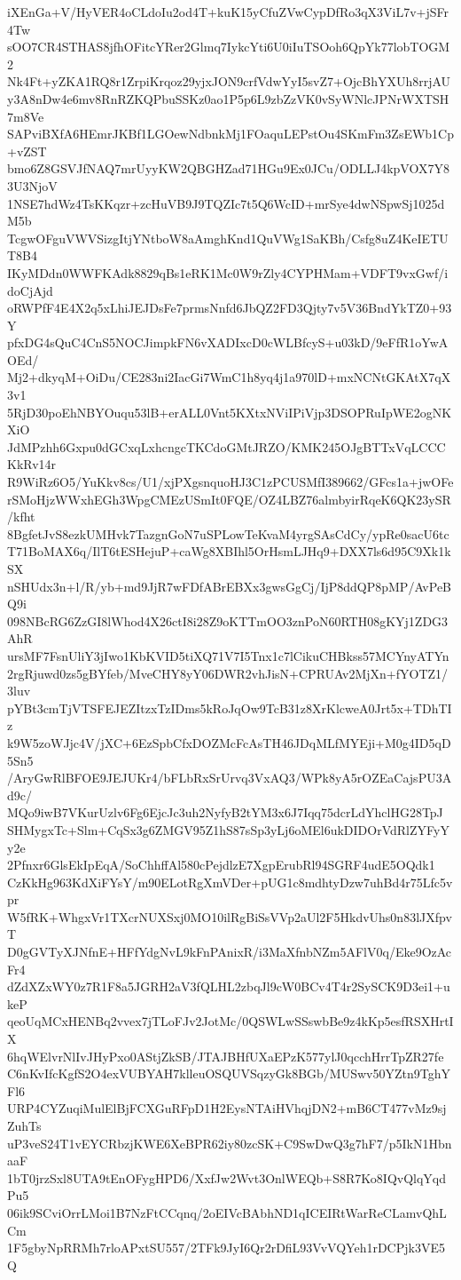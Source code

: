 iXEnGa+V/HyVER4oCLdoIu2od4T+kuK15yCfuZVwCypDfRo3qX3ViL7v+jSFr4Tw
sOO7CR4STHAS8jfhOFitcYRer2Glmq7IykcYti6U0iIuTSOoh6QpYk77lobTOGM2
Nk4Ft+yZKA1RQ8r1ZrpiKrqoz29yjxJON9crfVdwYyI5svZ7+OjcBhYXUh8rrjAU
y3A8nDw4e6mv8RnRZKQPbuSSKz0ao1P5p6L9zbZzVK0vSyWNlcJPNrWXTSH7m8Ve
SAPviBXfA6HEmrJKBf1LGOewNdbnkMj1FOaquLEPstOu4SKmFm3ZsEWb1Cp+vZST
bmo6Z8GSVJfNAQ7mrUyyKW2QBGHZad71HGu9Ex0JCu/ODLLJ4kpVOX7Y83U3NjoV
1NSE7hdWz4TsKKqzr+zcHuVB9J9TQZIc7t5Q6WcID+mrSye4dwNSpwSj1025dM5b
TcgwOFguVWVSizgItjYNtboW8aAmghKnd1QuVWg1SaKBh/Csfg8uZ4KeIETUT8B4
IKyMDdn0WWFKAdk8829qBs1eRK1Mc0W9rZly4CYPHMam+VDFT9vxGwf/idoCjAjd
oRWPfF4E4X2q5xLhiJEJDsFe7prmsNnfd6JbQZ2FD3Qjty7v5V36BndYkTZ0+93Y
pfxDG4sQuC4CnS5NOCJimpkFN6vXADIxcD0cWLBfcyS+u03kD/9eFfR1oYwAOEd/
Mj2+dkyqM+OiDu/CE283ni2IacGi7WmC1h8yq4j1a970lD+mxNCNtGKAtX7qX3v1
5RjD30poEhNBYOuqu53lB+erALL0Vnt5KXtxNViIPiVjp3DSOPRuIpWE2ogNKXiO
JdMPzhh6Gxpu0dGCxqLxhcngcTKCdoGMtJRZO/KMK245OJgBTTxVqLCCCKkRv14r
R9WiRz6O5/YuKkv8cs/U1/xjPXgsnquoHJ3C1zPCUSMfI389662/GFcs1a+jwOFe
rSMoHjzWWxhEGh3WpgCMEzUSmIt0FQE/OZ4LBZ76almbyirRqeK6QK23ySR/kfht
8BgfetJvS8ezkUMHvk7TazgnGoN7uSPLowTeKvaM4yrgSAsCdCy/ypRe0sacU6tc
T71BoMAX6q/IlT6tESHejuP+caWg8XBIhl5OrHsmLJHq9+DXX7ls6d95C9Xk1kSX
nSHUdx3n+l/R/yb+md9JjR7wFDfABrEBXx3gwsGgCj/IjP8ddQP8pMP/AvPeBQ9i
098NBcRG6ZzGI8lWhod4X26ctI8i28Z9oKTTmOO3znPoN60RTH08gKYj1ZDG3AhR
ursMF7FsnUliY3jIwo1KbKVID5tiXQ71V7I5Tnx1c7lCikuCHBkss57MCYnyATYn
2rgRjuwd0zs5gBYfeb/MveCHY8yY06DWR2vhJisN+CPRUAv2MjXn+fYOTZ1/3luv
pYBt3cmTjVTSFEJEZItzxTzIDms5kRoJqOw9TcB31z8XrKlcweA0Jrt5x+TDhTIz
k9W5zoWJjc4V/jXC+6EzSpbCfxDOZMcFcAsTH46JDqMLfMYEji+M0g4ID5qD5Sn5
/AryGwRlBFOE9JEJUKr4/bFLbRxSrUrvq3VxAQ3/WPk8yA5rOZEaCajsPU3Ad9c/
MQo9iwB7VKurUzlv6Fg6EjcJc3uh2NyfyB2tYM3x6J7Iqq75dcrLdYhclHG28TpJ
SHMygxTc+Slm+CqSx3g6ZMGV95Z1hS87sSp3yLj6oMEl6ukDIDOrVdRlZYFyYy2e
2Pfnxr6GlsEkIpEqA/SoChhffAl580cPejdlzE7XgpErubRl94SGRF4udE5OQdk1
CzKkHg963KdXiFYsY/m90ELotRgXmVDer+pUG1c8mdhtyDzw7uhBd4r75Lfc5vpr
W5fRK+WhgxVr1TXcrNUXSxj0MO10ilRgBiSsVVp2aUl2F5HkdvUhs0n83lJXfpvT
D0gGVTyXJNfnE+HFfYdgNvL9kFnPAnixR/i3MaXfnbNZm5AFlV0q/Eke9OzAcFr4
dZdXZxWY0z7R1F8a5JGRH2aV3fQLHL2zbqJl9cW0BCv4T4r2SySCK9D3ei1+ukeP
qeoUqMCxHENBq2vvex7jTLoFJv2JotMc/0QSWLwSSswbBe9z4kKp5esfRSXHrtIX
6hqWElvrNlIvJHyPxo0AStjZkSB/JTAJBHfUXaEPzK577ylJ0qcchHrrTpZR27fe
C6nKvIfcKgfS2O4exVUBYAH7klleuOSQUVSqzyGk8BGb/MUSwv50YZtn9TghYFl6
URP4CYZuqiMulElBjFCXGuRFpD1H2EysNTAiHVhqjDN2+mB6CT477vMz9sjZuhTs
uP3veS24T1vEYCRbzjKWE6XeBPR62iy80zcSK+C9SwDwQ3g7hF7/p5IkN1HbnaaF
1bT0jrzSxl8UTA9tEnOFygHPD6/XxfJw2Wvt3OnlWEQb+S8R7Ko8IQvQlqYqdPu5
06ik9SCviOrrLMoi1B7NzFtCCqnq/2oEIVcBAbhND1qICEIRtWarReCLamvQhLCm
1F5gbyNpRRMh7rloAPxtSU557/2TFk9JyI6Qr2rDfiL93VvVQYeh1rDCPjk3VE5Q

